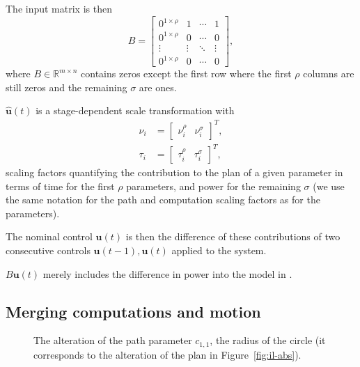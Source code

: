 The input matrix is then
\begin{equation}
  B=\begin{bmatrix} 
    0^{1\times\rho} & 1      & \cdots & 1      \\
    0^{1\times\rho} & 0      & \cdots & 0      \\ 
    \vdots          & \vdots & \ddots & \vdots \\
    0^{1\times\rho} & 0      & \cdots & 0      \end{bmatrix},
\end{equation}
where $B\in\mathbb{R}^{m\times n}$ contains zeros except the first row where the first $\rho$ columns are still zeros and the remaining $\sigma$ are ones. 

$\hat{\mathbf{u}}(t)$ is a stage-dependent scale transformation with 
\begin{subequations}\begin{align}
\nu_i&=\begin{bmatrix}\nu_i^\rho & \nu_i^\sigma\end{bmatrix}^T,\\ 
\tau_i&=\begin{bmatrix}\tau_i^\rho & \tau_i^\sigma\end{bmatrix}^T,
\end{align}\end{subequations}
scaling factors quantifying the contribution to the plan of a given parameter in terms of time for the first $\rho$ parameters, and power for the remaining $\sigma$ (we use the same notation for the path and computation scaling factors as for the parameters). 

The nominal control $\mathbf{u}(t)$ is then the difference of these contributions of two consecutive controls $\mathbf{u}(t-1),\mathbf{u}(t)$ applied to the system. 

$B\mathbf{u}(t)$ merely includes the difference in power into the model in .

\subsection{Merging computations and motion}
\label{cp:model:periodic:merging}

\begin{figure}[h]
  \centering
  
  \caption{The alteration of the path parameter $c_{1,1}$, the radius of the circle (it corresponds to the alteration of the plan in Figure~\ref{fig:il-abs}).}
  \label{fig:tee1}
\end{figure}

